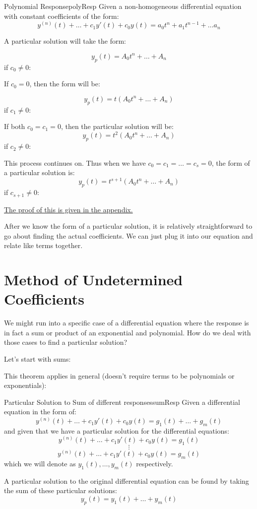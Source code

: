 \documentclass{report}
\begin{document}
\begin{mytheo}{Polynomial Response}{polyResp}
    Given a non-homogeneous differential equation with constant coefficients of the form:
    $$y^{(n)}(t) + \dots + c_1y'(t) + c_0y(t) = a_0t^n + a_1t^{n-1} + \dots a_n$$
    
    A particular solution will take the form:
    
    $$y_p(t) = A_0t^n + \dots + A_n$$
    if $c_0 \neq 0$:
    
    If $c_0=0$, then the form will be:
    
    $$y_p(t) = t(A_0t^n + \dots + A_n)$$
    if $c_1 \neq 0$:
    
    If both $c_0=c_1=0$, then the particular solution will be:
    $$y_p(t) = t^2(A_0t^n + \dots + A_n)$$
    if $c_2 \neq 0$:

    This process continues on. Thus when we have $c_0 = c_1 = \dots = c_s = 0$, the form of a particular solution is:
    $$y_p(t) = t^{s+1}(A_0t^n + \dots + A_n)$$
    if $c_{s+1} \neq 0$:
    
\end{mytheo}

\hyperref[sec:prPolyResp]{The proof of this is given in the appendix.}


After we know the form of a particular solution, it is relatively straightforward to go about finding the actual coefficients. We can just plug it into our equation and relate like terms together.

\section{Method of Undetermined Coefficients}
We might run into a specific case of a differential equation where the response is in fact a sum or product of an exponential and polynomial. How do we deal with those cases to find a particular solution?

Let's start with sums:

This theorem applies in general (doesn't require terms to be polynomials or exponentials):

\begin{mytheo}{Particular Solution to Sum of different responses}{sumResp}
    Given a differential equation in the form of:
    $$y^{(n)}(t) + \dots + c_1y'(t) + c_0y(t) = g_1(t) + \dots + g_m(t)$$
    and given that we have a particular solution for the differential equations:
    $$y^{(n)}(t) + \dots + c_1y'(t) + c_0y(t) = g_1(t)$$
    $$\vdots$$
    $$y^{(n)}(t) + \dots + c_1y'(t) + c_0y(t) = g_m(t)$$
    which we will denote as $y_1(t), \dots, y_m(t)$ respectively.
    
    A particular solution to the original differential equation can be found by taking the sum of these particular solutions:
    $$y_p(t) = y_1(t) + \dots + y_m(t)$$
    
\end{mytheo}
\end{document}
